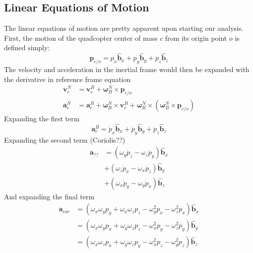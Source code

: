 \documentclass[lettersize,journal]{IEEEtran}
\begin{document}
\subsection{Linear Equations of Motion}
The linear equations of motion are pretty apparent upon starting our analysis.
First, the motion of the quadcopter center of mass $c$ from its origin point $o$ is defined simply:
\begin{equation}
  \mathbf{p}_{c/o} = p_x \mathbf{\hat{b}}_x + p_y \mathbf{\hat{b}}_y + p_z \mathbf{\hat{b}}_z
\end{equation}
The velocity and acceleration in the inertial frame would then be expanded with the derivative in reference frame equation 
\begin{align}
  \mathbf{v}^N_c &= \mathbf{v}^B_c + {\boldsymbol\omega^N_B}\times \mathbf{p}_{c/o} \\
  \mathbf{a}^N_c &= \mathbf{a}^B_c + {\boldsymbol\omega^N_B}\times \mathbf{v}^B_c + {\boldsymbol\omega^N_B} \times \left({\boldsymbol\omega^N_B} \times \mathbf{p}_{c/o}\right)
\end{align}
Expanding the first term
\begin{equation}
  \mathbf{a}^B_c = \ddot{p}_x \mathbf{\hat{b}}_x + \ddot{p}_y \mathbf{\hat{b}}_y + \ddot{p}_z \mathbf{\hat{b}}_z
\end{equation}
Expanding the second term (Coriolis??)
\begin{align}
  \mathbf{a}_{??}
  &= \left(\omega_y\dot{p}_z - \omega_z\dot{p}_y\right) \mathbf{\hat{b}}_x \nonumber \\
  &+ \left(\omega_z\dot{p}_x - \omega_x\dot{p}_z\right) \mathbf{\hat{b}}_y \nonumber \\
  &+ \left(\omega_x\dot{p}_y - \omega_y\dot{p}_x\right) \mathbf{\hat{b}}_z
\end{align}
And expanding the final term %
\begin{align}
  \mathbf{a}_{cor}
  &= \left(\omega_x\omega_yp_y+\omega_x\omega_zp_z-\omega_y^2p_x-\omega_z^2p_x\right) \mathbf{\hat{b}}_x \nonumber \\
  &= \left(\omega_x\omega_yp_x+\omega_y\omega_zp_z-\omega_x^2p_y-\omega_z^2p_y\right) \mathbf{\hat{b}}_y \nonumber \\
  &= \left(\omega_x\omega_zp_x+\omega_y\omega_zp_y-\omega_x^2p_z-\omega_y^2p_z\right) \mathbf{\hat{b}}_z
\end{align}
\end{document}
